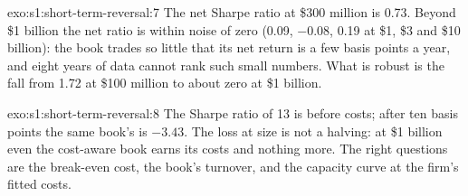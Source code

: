 \begin{solution}{exo:s1:short-term-reversal:7}
The net Sharpe ratio at \$300 million is 0.73. Beyond \$1 billion the net ratio is within noise of zero (0.09, $-0.08$, 0.19 at \$1, \$3 and \$10 billion):
the book trades so little that its net return is a few basis points a year, and eight years of data cannot rank such small numbers. What is robust is the
fall from 1.72 at \$100 million to about zero at \$1 billion.
\end{solution}

\begin{solution}{exo:s1:short-term-reversal:8}
The Sharpe ratio of 13 is before costs; after ten basis points the same book's is $-3.43$. The loss at size is not a halving: at \$1 billion even the
cost-aware book earns its costs and nothing more. The right questions are the break-even cost, the book's turnover, and the capacity curve at the firm's
fitted costs.
\end{solution}

